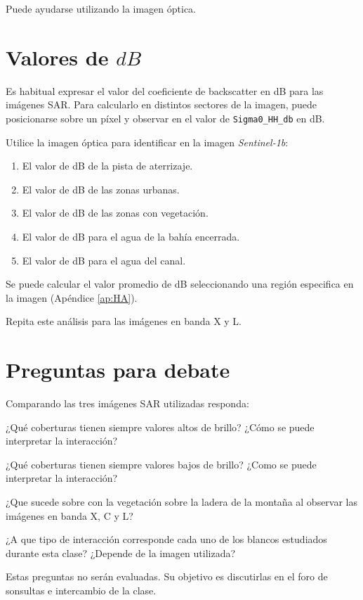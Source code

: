 Puede ayudarse utilizando la imagen óptica.


\section{Valores de $dB$}

Es habitual expresar el valor del coeficiente de backscatter en dB para las imágenes SAR. Para calcularlo en distintos sectores de la imagen, puede posicionarse sobre un píxel y observar en  el valor de \texttt{Sigma0\_HH\_db} en dB.


Utilice la imagen óptica para identificar en la imagen \emph{Sentinel-1b}:

 \begin{enumerate}
     \item El valor de dB de la pista de aterrizaje.
     \item El valor de dB de las zonas urbanas.
     \item El valor de dB de las zonas con vegetación.
     \item El valor de dB para el agua de la bahía encerrada.
     \item El valor de dB para el agua del canal.
 \end{enumerate}

Se puede calcular el valor promedio de dB seleccionando una región especifica en la imagen (Apéndice \ref{ap:HA}).

Repita este análisis para las imágenes en banda X y L.

\section{Preguntas para debate}

Comparando las tres imágenes SAR utilizadas responda:

\begin{que}
    ¿Qué coberturas tienen siempre valores altos de brillo? ¿Cómo se puede interpretar la interacción?
\end{que}

\begin{que}
    ¿Qué coberturas tienen siempre valores bajos de brillo? ¿Como se puede interpretar la interacción?
\end{que}

\begin{que}
  ¿Que sucede sobre con la vegetación sobre la ladera de la montaña al observar las imágenes en banda X, C y L?
\end{que}

\begin{que}
  ¿A que tipo de interacción corresponde cada uno de los blancos estudiados durante esta clase? ¿Depende de la imagen utilizada?
\end{que}

Estas preguntas no serán evaluadas. Su objetivo es discutirlas en el foro de sonsultas e intercambio de la clase.
